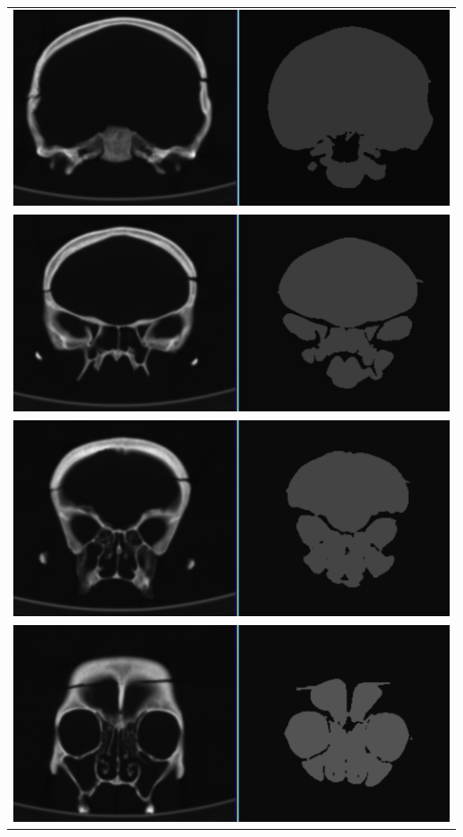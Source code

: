 \begin{table}[ht]
    \centering
    \begin{tabular}{c}
    \includegraphics[scale=.5]{data/png/20}\\
    \newline
    \includegraphics[scale=.5]{data/png/23}\\
    \newline
    \includegraphics[scale=.5]{data/png/25}\\
    \newline
    \includegraphics[scale=.5]{data/png/27}\\
    \end{tabular}
    \label{tab:gt3}
\end{table}%

